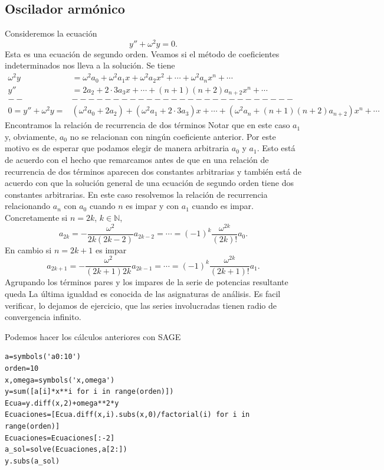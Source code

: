 \subsection{Oscilador armónico}

\begin{ejemplo}{} Consideremos la ecuación
\[y''+\omega^2y=0.\]
Esta es una ecuación de segundo orden. Veamos si el método de coeficientes indeterminados nos lleva a la solución. Se tiene
\[\begin{split}
    \omega^2y&=\omega^2a_0+\omega^2a_1x+\omega^2a_2x^2+\cdots+\omega^2a_nx^n+\cdots\\
  y''&=2a_2+2\cdot 3a_3x+\cdots+(n+1)(n+2)a_{n+2}x^n+\cdots\\
--&---------------------------\\
0=y''+\omega^2y =& (\omega^2a_0+2a_2)+(\omega^2a_1+2\cdot 3a_3)x+\cdots +(\omega^2a_n+(n+1)(n+2)a_{n+2})x^n+\cdots
  \end{split}
\]
Encontramos la relación de recurrencia de dos términos
Notar que  en este caso $a_1$ y, obviamente, $a_0$ no se relacionan con ningún coeficiente anterior. Por este motivo es de esperar que podamos elegir de manera arbitraria $a_0$ y $a_1$. Esto está de acuerdo con el hecho que remarcamos antes de que en una relación de recurrencia de dos términos aparecen dos constantes arbitrarias y también está de acuerdo con que la solución general de una ecuación de segundo orden tiene dos constantes arbitrarias. En este caso resolvemos la relación de recurrencia relacionando $a_n$ con $a_0$ cuando $n$ es impar y con $a_1$ cuando es impar. Concretamente si $n=2k$, $k\in\mathbb{N}$,
\[a_{2k}=-\frac{\omega^2}{2k(2k-2)}a_{2k-2}=\cdots=(-1)^k\frac{\omega^{2k}}{(2k)!}a_0.\]
En cambio si $n=2k+1$ es impar
\[a_{2k+1}=-\frac{\omega^2}{(2k+1)2k}a_{2k-1}=\cdots=(-1)^k\frac{\omega^{2k}}{(2k+1)!}a_1.\]
Agrupando los términos pares y los impares de la serie de potencias resultante queda
La última igualdad es conocida de las asignaturas de análisis. Es facil verificar, lo dejamos de ejercicio, que las series involucradas tienen radio de convergencia infinito.

Podemos hacer los cálculos anteriores con SAGE

\begin{lstlisting}
a=symbols('a0:10')
orden=10
x,omega=symbols('x,omega')
y=sum([a[i]*x**i for i in range(orden)])
Ecua=y.diff(x,2)+omega**2*y
Ecuaciones=[Ecua.diff(x,i).subs(x,0)/factorial(i) for i in range(orden)]
Ecuaciones=Ecuaciones[:-2]
a_sol=solve(Ecuaciones,a[2:])
y.subs(a_sol)
\end{lstlisting}


\end{ejemplo}

